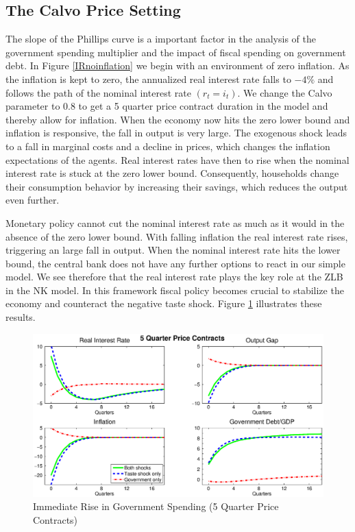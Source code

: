 \documentclass[12pt,a4paper,oneside,titlepage]{article}
\begin{document}
\subsection*{The Calvo Price Setting}
The slope of the Phillips curve is a important factor in the analysis of the government spending multiplier and the impact of fiscal spending on government debt. In Figure \ref{IRnoinflation} we begin with an environment of zero inflation.
As the inflation is kept to zero, the annualized real interest rate falls to $-4\%$ and follows the path of the nominal interest rate $\left(r_t = i_t\right)$. We change the Calvo parameter to 0.8 to get a 5 quarter price contract duration in the model and thereby allow for inflation. When the economy now hits the zero lower bound and inflation is responsive, the fall in output is very large. The exogenous shock leads to a fall in marginal costs and a decline in prices, which changes the inflation expectations of the agents. Real interest rates have then to rise when the nominal interest rate is stuck at the zero lower bound. Consequently, households change their consumption behavior by increasing their savings, which reduces the output even further.
\par
\bigskip
Monetary policy cannot cut the nominal interest rate as much as it would in the absence of the zero lower bound. With falling inflation the real interest rate rises, triggering an large fall in output. When the nominal interest rate hits the lower bound, the central bank does not have any further options to react in our simple model. We see therefore that the real interest rate plays the key role at the ZLB in the NK model. In this framework fiscal policy becomes crucial to stabilize the economy and counteract the negative taste shock. Figure \ref{IR5quarter} illustrates these results.

\begin{figure}[!th]
\includegraphics[width=\textwidth]{Paperpics/Figure25quarter}
\caption{Immediate Rise in Government Spending (5 Quarter Price Contracts)}
\label{IR5quarter}
\end{figure}
\end{document}
